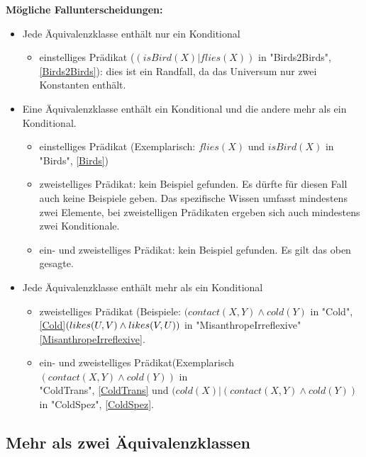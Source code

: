 \documentclass[draft]{scrreprt}
\begin{document}
\textbf{Mögliche Fallunterscheidungen:} \label{Fallunterscheidung Formel 2Aequi}
\begin{itemize}
	\item Jede Äquivalenzklasse enthält nur ein Konditional 
	\begin{itemize}
		\item einstelliges Prädikat ($ (isBird(X)|flies(X)) $ in "{}Birds2Birds"{}, \ref{Birds2Birds}): dies ist ein Randfall, da das Universum nur zwei Konstanten enthält.
	\end{itemize}
	\item Eine Äquivalenzklasse enthält ein Konditional und die andere mehr als ein Konditional. 
	\begin{itemize}
		\item einstelliges Prädikat (Exemplarisch: $ flies(X) $ und $ isBird(X) $ in "{}Birds"{}, \ref{Birds}) 
		\item zweistelliges Prädikat: kein Beispiel gefunden. Es dürfte für diesen Fall auch keine Beispiele geben. Das spezifische Wissen umfasst mindestens zwei Elemente, bei zweistelligen Prädikaten ergeben sich auch mindestens zwei Konditionale.
		\item  ein- und zweistelliges Prädikat: kein Beispiel gefunden. Es gilt das oben gesagte.   
	\end{itemize}
	\item Jede Äquivalenzklasse enthält mehr als ein Konditional 
	\begin{itemize}
		\item zweistelliges Prädikat (Beispiele: $ (contact(X,Y) \land cold(Y) $ in "{}Cold"{}, \ref{Cold}$ \\ (likes(U,V) \land likes(V,U)) $ in "{}MisanthropeIrreflexive"{} \ref{MisanthropeIrreflexive}.  
		\item ein- und zweistelliges Prädikat(Exemplarisch $ (contact(X,Y) \land cold(Y)) $ in \\ "{}ColdTrans"{}, \ref{ColdTrans} und  $  (cold(X) | (contact(X,Y) \land cold(Y)) $ in "{}ColdSpez"{}, \ref{ColdSpez}.
	\end{itemize}
\end{itemize}


\subsection{Mehr als zwei Äquivalenzklassen} 
\end{document}
